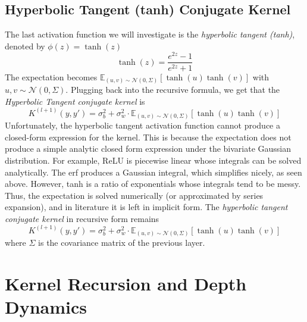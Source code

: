 \documentclass{article}
\newcommand{\EX}{\mathbb{E}}
\begin{document}
\subsection{Hyperbolic Tangent (tanh) Conjugate Kernel}
The last activation function we will investigate is the \textit{hyperbolic tangent (tanh)}, denoted by $\phi(z)=\tanh(z)$ 
$$\tanh(z)=\frac{e^{2z}-1}{e^{2z}+1}$$
The expectation becomes $\EX_{(u,v)\sim \mathcal{N}(0,\Sigma)}[\tanh(u)\tanh(v)]$ with $u,v\sim \mathcal{N}(0,\Sigma)$. Plugging back into the recursive formula, we get that the \textit{Hyperbolic Tangent conjugate kernel} is 
$$K^{(l+1)}(y,y')=\sigma_b^2+\sigma_w^2\cdot \EX_{(u,v)\sim \mathcal{N}(0,\Sigma)}[\tanh(u)\tanh(v)]$$
Unfortunately, the hyperbolic tangent activation function cannot produce a closed-form expression for the kernel. This is because the expectation does not produce a simple analytic closed form expression under the bivariate Gaussian distribution. For example, ReLU is piecewise linear whose integrals can be solved analytically. The erf produces a Gaussian integral, which simplifies nicely, as seen above. However, tanh is a ratio of exponentials whose integrals tend to be messy. Thus, the expectation is solved numerically (or approximated by series expansion), and in literature it is left in implicit form. The \textit{hyperbolic tangent conjugate kernel} in recursive form remains
$$K^{(l+1)}(y,y')=\sigma_b^2+\sigma_w^2\cdot \EX_{(u,v)\sim \mathcal{N}(0,\Sigma)}[\tanh(u)\tanh(v)]$$
where $\Sigma$ is the covariance matrix of the previous layer.
\section{Kernel Recursion and Depth Dynamics}
\end{document}
